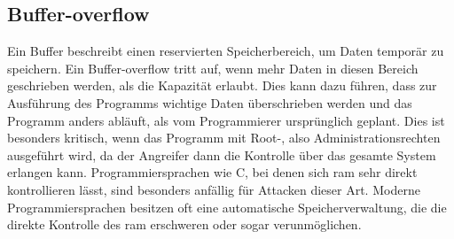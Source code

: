 \documentclass[11pt, a4paper]{article}
\begin{document}
\subsection{Buffer-overflow}
Ein Buffer beschreibt einen reservierten Speicherbereich, um Daten temporär zu speichern. Ein Buffer-overflow tritt auf, wenn mehr Daten in diesen Bereich geschrieben werden, als die Kapazität erlaubt. Dies kann dazu führen, dass zur Ausführung des Programms wichtige Daten überschrieben werden und das Programm anders abläuft, als vom Programmierer ursprünglich geplant. Dies ist besonders kritisch, wenn das Programm mit Root-, also Administrationsrechten ausgeführt wird, da der Angreifer dann die Kontrolle über das gesamte System erlangen kann. Programmiersprachen wie C, bei denen sich \gls{ram} sehr direkt kontrollieren lässt, sind besonders anfällig für Attacken dieser Art. Moderne Programmiersprachen besitzen oft eine automatische Speicherverwaltung, die die direkte Kontrolle des \gls{ram} erschweren oder sogar verunmöglichen.
\end{document}
